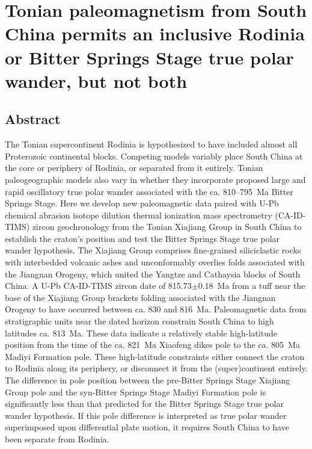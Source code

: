 \chapter[Tonian paleomagnetism from South China permits an inclusive Rodinia or Bitter Springs Stage true polar wander, but not both][Xiajiang Group]{Tonian paleomagnetism from South China permits an inclusive Rodinia or Bitter Springs Stage true polar wander, but not both}

\section{Abstract}

The Tonian supercontinent Rodinia is hypothesized to have included almost all Proterozoic continental blocks. Competing models variably place South China at the core or periphery of Rodinia, or separated from it entirely. Tonian paleogeographic models also vary in whether they incorporate proposed large and rapid oscillatory true polar wander associated with the ca. 810--795~Ma Bitter Springs Stage. Here we develop new paleomagnetic data paired with U-Pb chemical abrasion isotope dilution thermal ionization mass spectrometry (CA-ID-TIMS) zircon geochronology from the Tonian Xiajiang Group in South China to establish the craton's position and test the Bitter Springs Stage true polar wander hypothesis. The Xiajiang Group comprises fine-grained siliciclastic rocks with interbedded volcanic ashes and unconformably overlies folds associated with the Jiangnan Orogeny, which united the Yangtze and Cathaysia blocks of South China. A U-Pb CA-ID-TIMS zircon date of 815.73$\pm$0.18~Ma from a tuff near the base of the Xiajiang Group brackets folding associated with the Jiangnan Orogeny to have occurred between ca. 830 and 816~Ma. Paleomagnetic data from stratigraphic units near the dated horizon constrain South China to high latitudes ca. 813~Ma. These data indicate a relatively stable high-latitude position from the time of the ca. 821~Ma Xiaofeng dikes pole to the ca. 805~Ma Madiyi Formation pole. These high-latitude constraints either connect the craton to Rodinia along its periphery, or disconnect it from the (super)continent entirely. The difference in pole position between the pre-Bitter Springs Stage Xiajiang Group pole and the syn-Bitter Springs Stage Madiyi Formation pole is significantly less than that predicted for the Bitter Springs Stage true polar wander hypothesis. If this pole difference is interpreted as true polar wander superimposed upon differential plate motion, it requires South China to have been separate from Rodinia.

